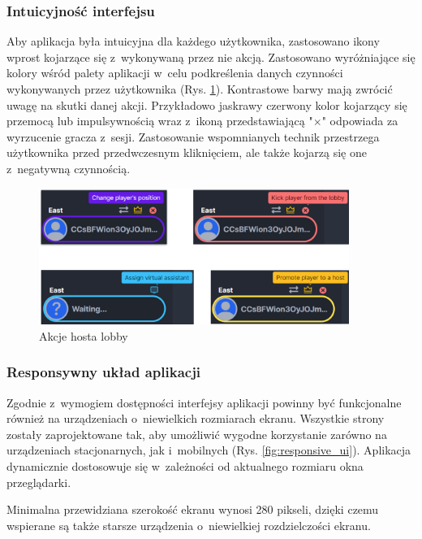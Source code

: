 \subsubsection{Intuicyjność interfejsu}

Aby aplikacja była intuicyjna dla każdego użytkownika,
zastosowano ikony wprost kojarzące się z~wykonywaną
przez nie akcją. Zastosowano wyróżniające się kolory wśród palety
aplikacji w~celu podkreślenia danych czynności wykonywanych
przez użytkownika (Rys. \ref{fig:host_actions_ui}). Kontrastowe barwy mają zwrócić uwagę na
skutki danej akcji. Przykładowo jaskrawy czerwony kolor
kojarzący się przemocą lub impulsywnością wraz z~ikoną
przedstawiającą "$\times$"\xspace odpowiada za wyrzucenie gracza
z~sesji. Zastosowanie wspomnianych technik przestrzega
użytkownika przed przedwczesnym kliknięciem, ale także kojarzą
się one z~negatywną czynnością.

\begin{figure}[h!]
  \centering
  \includegraphics[width=0.9\textwidth]{img/widoki/host_actions.png}
  \caption{Akcje hosta lobby}
  \label{fig:host_actions_ui}
\end{figure}

\FloatBarrier

\subsubsection{Responsywny układ aplikacji}

Zgodnie z~wymogiem dostępności interfejsy aplikacji powinny
być funkcjonalne również na urządzeniach o~niewielkich
rozmiarach ekranu. Wszystkie strony zostały zaprojektowane
tak, aby umożliwić wygodne korzystanie zarówno na urządzeniach
stacjonarnych, jak i~mobilnych (Rys. \ref{fig:responsive_ui}). Aplikacja dynamicznie
dostosowuje się w~zależności od aktualnego rozmiaru okna
przeglądarki.

Minimalna przewidziana
szerokość ekranu wynosi 280 pikseli, dzięki czemu wspierane
są także starsze urządzenia o~niewielkiej rozdzielczości
ekranu.


